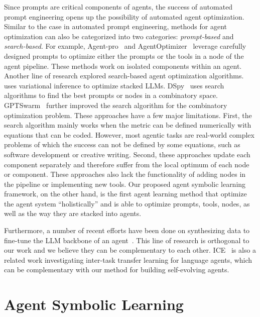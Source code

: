 \documentclass{article}
\newcommand{\baby}{agent symbolic learning\xspace}
\begin{document}
Since prompts are critical components of agents, the success of automated prompt engineering opens up the possibility of automated agent optimization. Similar to the case in automated prompt engineering, methods for agent optimization can also be categorized into two categories: \textit{prompt-based} and \textit{search-based}. For example, Agent-pro~\citep{zhang2024agentpro} and AgentOptimizer~\citep{zhang2024offline} leverage carefully designed prompts to optimize either the prompts or the tools in a node of the agent pipeline. These methods work on isolated components within an agent. Another line of research explored search-based agent optimization algorithms. ~\citet{sordoni2023joint} uses variational inference to optimize stacked LLMs. DSpy~\citep{khattab2023dspy} uses search algorithms to find the best prompts or nodes in a combinatory space. GPTSwarm~\citep{zhuge2024language} further improved the search algorithm for the combinatory optimization problem. These approaches have a few major limitations. First, the search algorithm mainly works when the metric can be defined numerically with equations that can be coded. However, most agentic tasks are real-world complex problems of which the success can not be defined by some equations, such as software development or creative writing. Second, these approaches update each component separately and therefore suffer from the local optimum of each node or component. These approaches also lack the functionality of adding nodes in the pipeline or implementing new tools.  Our proposed \baby framework, on the other hand, is the first agent learning method that optimize the agent system ``holistically'' and is able to optimize prompts, tools, nodes, as well as the way they are stacked into agents. 

Furthermore, a number of recent efforts have been done on synthesizing data to fine-tune the LLM backbone of an agent~\citep{chen2023fireact,DBLP:journals/corr/abs-2401-05268,song2024trial}. This line of research is orthogonal to our work and we believe they can be complementary to each other. ICE~\citep{qian2024investigateconsolidateexploit} is also a related work investigating inter-task transfer learning for language agents, which can be complementary with our method for building self-evolving agents.


\section{Agent Symbolic Learning}
\end{document}
